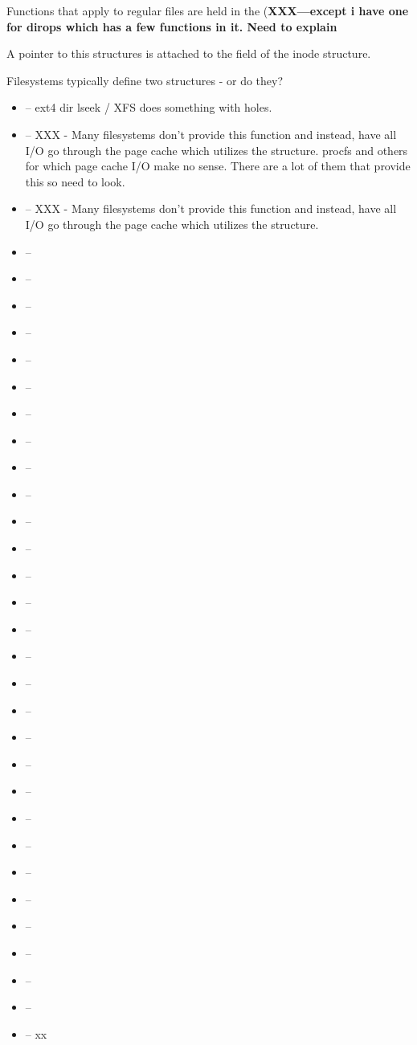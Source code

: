 Functions that apply to regular files are held in the  (\textbf{XXX---except i have one for dirops which has a few functions in it. Need to explain}

A pointer to this structures is attached to the  field of the inode structure.

Filesystems typically define two  structures - or do they?

\begin{itemize}
    \item {} -- ext4 dir lseek / XFS does something with holes. 
    \item {} -- XXX - Many filesystems don't provide this function and instead, have all I/O go through the page cache
    	which utilizes the  structure. procfs and others for which page cache I/O make no sense.
	There are a lot of them that provide this so need to look.
    \item {} -- XXX - Many filesystems don't provide this function and instead, have all I/O go through the page cache
    	which utilizes the  structure.
    \item {} --
    \item {} --
    \item {} --
    \item {} --
    \item {} --
    \item {} --
    \item {} --
    \item {} --
    \item {} --
    \item {} --
    \item {} --
    \item {} --
    \item {} --
    \item {} --
    \item {} --
    \item {} --
    \item {} --
    \item {} --
    \item {} --
    \item {} --
    \item {} --
    \item {} --
    \item {} --
    \item {} --
    \item {} --
    \item {} --
    \item {} --
    \item {} --
    \item {} --
    \item {} -- xx
\end{itemize}

